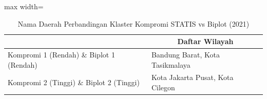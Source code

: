 \begin{table}[H]
\centering
\caption{Nama Daerah Perbandingan Klaster Kompromi STATIS vs Biplot (2021)} \label{tab:sample2biplot_comp_name_2021}
\begin{adjustbox}{max width=\textwidth}
\begin{tabular}{|>{\centering\arraybackslash}p{4cm}|p{10cm}|}
\hline
\multicolumn{1}{|c|}{\textbf{Kategori}} & \multicolumn{1}{c|}{\textbf{Daftar Wilayah}} \\
\hline
Kompromi 1 (Rendah) \& Biplot 1 (Rendah) & Bandung Barat, Kota Tasikmalaya \\
\hline
Kompromi 2 (Tinggi) \& Biplot 2 (Tinggi) & Kota Jakarta Pusat, Kota Cilegon \\
\hline
\end{tabular}
\end{adjustbox}
\end{table}